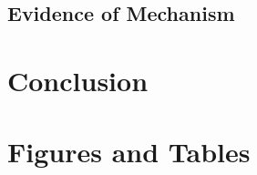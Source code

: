 \documentclass[11pt]{article}
\begin{document}
\subsection{Evidence of Mechanism}



\section{Conclusion} \label{secconcl}


\clearpage
\pagebreak

\begin{singlespace}

%
\end{singlespace}

\pagebreak
\clearpage

\section*{Figures and Tables}


%
%
%

%
%
%
\end{document}
